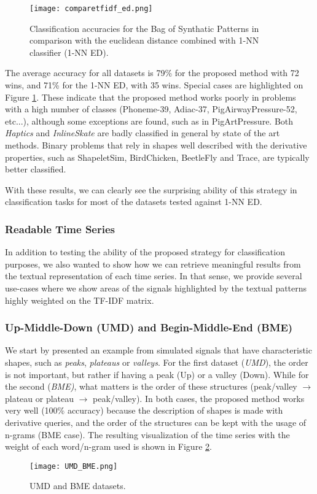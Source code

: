{\begin{figure}[h]
    \centering
    \texttt{[image: comparetfidf\_ed.png]}
    \caption{Classification accuracies for the Bag of Synthatic Patterns in comparison with the euclidean distance combined with 1-NN classifier (1-NN ED).}
    \label{fig:comparison_1}
\end{figure}

The average accuracy for all datasets is 79\% for the proposed method with 72 wins, and 71\% for the 1-NN ED, with 35 wins. Special cases are highlighted on Figure \ref{fig:comparison_1}. These indicate that the proposed method works poorly in problems with a high number of classes (Phoneme-39, Adiac-37, PigAirwayPressure-52, etc...), although some exceptions are found, such as in PigArtPressure. Both \textit{Haptics} and \textit{InlineSkate} are badly classified in general by state of the art methods. Binary problems that rely in shapes well described with the derivative properties, such as ShapeletSim, BirdChicken, BeetleFly and Trace, are typically better classified.\par
With these results, we can clearly see the surprising ability of this strategy in classification tasks for most of the datasets tested against 1-NN ED. 

\subsubsection{Readable Time Series}

In addition to testing the ability of the proposed strategy for classification purposes, we also wanted to show how we can retrieve meaningful results from the textual representation of each time series. In that sense, we provide several use-cases where we show areas of the signals highlighted by the textual patterns highly weighted on the TF-IDF matrix.

\subsubsection{Up-Middle-Down (UMD) and Begin-Middle-End (BME)}

We start by presented an example from simulated signals that have characteristic shapes, such as \textit{peaks}, \textit{plateaus} or \textit{valleys}. For the first dataset (\textit{UMD}), the order is not important, but rather if having a peak (Up) or a valley (Down). While for the second (\textit{BME)}, what matters is the order of these structures (peak/valley $\rightarrow$ plateau or plateau $\rightarrow$ peak/valley). In both cases, the proposed method works very well (100\% accuracy) because the description of shapes is made with derivative queries, and the order of the structures can be kept with the usage of n-grams (BME case). The resulting visualization of the time series with the weight of each word/n-gram used is shown in Figure \ref{fig:UMD_BME}.
\begin{figure}
    \centering
    \texttt{[image: UMD\_BME.png]}
    \caption{UMD and BME datasets. }
    \label{fig:UMD_BME}
\end{figure}

}
